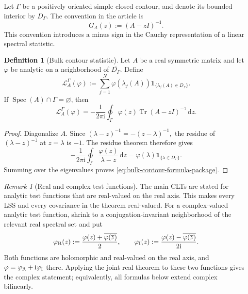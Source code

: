 \documentclass[11pt]{article}
\theoremstyle{definition}
\newtheorem{definition}[theorem]{Definition}
\theoremstyle{remark}
\newtheorem{remark}[theorem]{Remark}
\newcommand{\Tr}{\operatorname{Tr}}
\newcommand{\spec}{\operatorname{Spec}}
\newcommand{\ii}{\mathrm i}
\newcommand{\dd}{\mathrm d}
\newcommand{\one}{\mathbf 1}
\begin{document}
Let \(\Gamma\) be a positively oriented simple closed contour, and denote its
bounded interior by \(D_\Gamma\).  The convention in the article is
\begin{equation}\label{eq:resolvent-convention-package}
 G_A(z):=(A-zI)^{-1}.
\end{equation}
This convention introduces a minus sign in the Cauchy representation of a
linear spectral statistic.

\begin{definition}[Bulk contour statistic]\label{def:bulk-stat-package}
Let \(A\) be a real symmetric matrix and let \(\varphi\) be analytic on a
neighborhood of \(\overline{D_\Gamma}\).  Define
\begin{equation}\label{eq:bulk-stat-package}
 \mathcal L_A^\Gamma(\varphi)
 :=\sum_{j=1}^N
 \varphi(\lambda_j(A))\one_{\{\lambda_j(A)\in D_\Gamma\}}.
\end{equation}
If \(\spec(A)\cap\Gamma=\varnothing\), then
\begin{equation}\label{eq:bulk-contour-formula-package}
 \mathcal L_A^\Gamma(\varphi)
 =-\frac{1}{2\pi\ii}
 \oint_\Gamma
 \varphi(z)\Tr(A-zI)^{-1}\,\dd z.
\end{equation}
\end{definition}

\begin{proof}
Diagonalize \(A\).  Since
\(
 (\lambda-z)^{-1}=-(z-\lambda)^{-1},
\)
the residue of \((\lambda-z)^{-1}\) at \(z=\lambda\) is \(-1\).
The residue theorem therefore gives
\[
 -\frac{1}{2\pi\ii}\oint_\Gamma
 \frac{\varphi(z)}{\lambda-z}\,\dd z
 =\varphi(\lambda)\one_{\{\lambda\in D_\Gamma\}}.
\]
Summing over the eigenvalues proves \eqref{eq:bulk-contour-formula-package}.
\end{proof}


\begin{remark}[Real and complex test functions]
The main CLTs are stated for analytic test functions that are real-valued on
the real axis.  This makes every LSS and every covariance in the theorem
real-valued.  For a complex-valued analytic test function, shrink to a
conjugation-invariant neighborhood of the relevant real spectral set and put
\[
 \varphi_{\rm R}(z):=\frac{\varphi(z)+\overline{\varphi(\overline z)}}2,
 \qquad
 \varphi_{\rm I}(z):=\frac{\varphi(z)-\overline{\varphi(\overline z)}}{2\ii}.
\]
Both functions are holomorphic and real-valued on the real axis, and
\(\varphi=\varphi_{\rm R}+\ii\varphi_{\rm I}\) there.  Applying the joint real
theorem to these two functions gives the complex statement; equivalently, all
formulas below extend complex bilinearly.
\end{remark}
\end{document}
